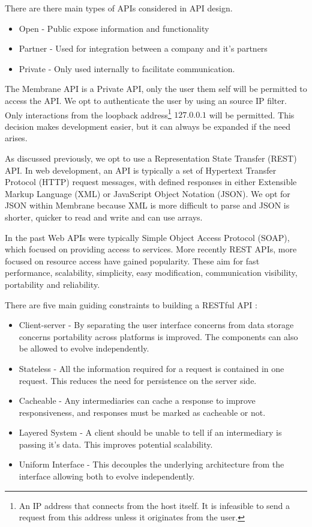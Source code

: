 \documentclass[11pt, a4paper, twocolumn, twoside]{report}
\begin{document}
There are there main types of APIs considered in API design. \citep{boyd2017api}

\begin{itemize}
 \item Open - Public expose information and functionality
 \item Partner - Used for integration between a company and it's partners
 \item Private - Only used internally to facilitate communication.
\end{itemize}

The Membrane API is a Private API, only the user them self will be permitted to access the API. We opt to authenticate the user by using an source IP filter. Only interactions from the loopback address\footnote{An IP address that connects from the host itself. \citep{hinden2006ip} It is infeasible to send a request from this address unless it originates from the user.} $127.0.0.1$ will be permitted. This decision makes development easier, but it can always be expanded if the need arises.

As discussed previously, we opt to use a Representation State Transfer (REST) API. In web development, an API is typically a set of Hypertext Transfer Protocol (HTTP) request messages, with defined responses in either Extensible Markup Language (XML) or JavaScript Object Notation (JSON). We opt for JSON within Membrane because XML is more difficult to parse and JSON is shorter, quicker to read and write and can use arrays.

In the past Web APIs were typically Simple Object Access Protocol (SOAP), which focused on providing access to services. \citep{benslimane2008services} More recently REST APIs, more focused on resource access have gained popularity. These aim for fast performance, scalability, simplicity, easy modification, communication visibility, portability  and reliability. \citep{fielding2000architectural}

There are five main guiding constraints to building a RESTful API \citep{fielding2000architectural}: 

\begin{itemize}
 \item Client-server - By separating the user interface concerns from data storage concerns portability across platforms is improved. The components can also be allowed to evolve independently.
 \item Stateless - All the information required for a request is contained in one request. This reduces the need for persistence on the server side.
 \item Cacheable - Any intermediaries can cache a response to improve responsiveness, and responses must be marked as cacheable or not.
 \item Layered System - A client should be unable to tell if an intermediary is passing it's data. This improves potential scalability.
 \item Uniform Interface - This decouples the underlying architecture from the interface allowing both to evolve independently.
\end{itemize}
\end{document}
